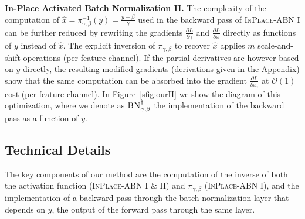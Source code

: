 \documentclass[10pt,twocolumn,letterpaper]{article}
\newcommand{\bnInplace}{\textsc{InPlace-ABN}\xspace}
\newcommand{\myparagraph}[1]{\vspace{5pt}\noindent\textbf{#1}}
\begin{document}
\myparagraph{In-Place Activated Batch Normalization II.}
The complexity of the computation of $\hat x=\pi_{\gamma,\beta}^{-1}(y)=\frac{y-\beta}{\gamma}$ used in the backward pass of \bnInplace I can be further reduced by rewriting the gradients $\frac{\partial L}{\partial \gamma}$ and $\frac{\partial L}{\partial x}$ directly as functions of $y$ instead of $\hat x$. The explicit inversion of $\pi_{\gamma,\beta}$ to recover $\hat x$ applies $m$ scale-and-shift operations (per feature channel). If the partial derivatives are however based on $y$ directly, the resulting modified gradients (derivations given in the Appendix) show that the same computation can be absorbed into the gradient $\frac{\partial L}{\partial x_i}$ at $\mathcal O(1)$ cost (per feature channel). In Figure~\ref{sfig:ourII} we show the diagram of this optimization, where we denote as $\textsc {BN}^\dagger_{\gamma,\beta}$ the implementation of the backward pass as a function of $y$. 


\subsection{Technical Details}\label{ss:tenchnical}
The key components of our method are the computation of the inverse of both the activation function (\bnInplace I \& II) and $\pi_{\gamma,\beta}$ (\bnInplace I), and the implementation of a backward pass through the batch normalization layer that depends on $y$, \ie the output of the forward pass through the same layer.
\end{document}
